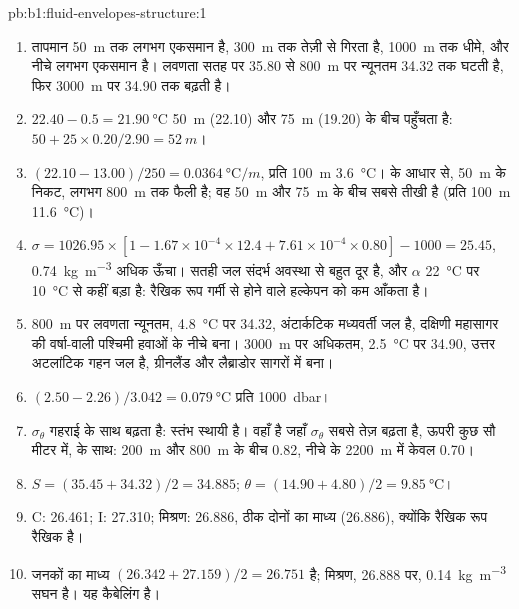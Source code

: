 \begin{solution}{pb:b1:fluid-envelopes-structure:1}
\begin{enumerate}
  \item तापमान \qty{50}{m} तक लगभग एकसमान है, \qty{300}{m} तक तेज़ी से गिरता है, \qty{1000}{m} तक धीमे, और नीचे लगभग एकसमान है। लवणता सतह पर 35.80 से \qty{800}{m} पर न्यूनतम 34.32 तक घटती है, फिर \qty{3000}{m} पर 34.90 तक बढ़ती है।
  \item $22.40 - 0.5 = \qty{21.90}{\celsius}$ \qty{50}{m} (22.10) और \qty{75}{m} (19.20) के बीच पहुँचता है: $50 + 25 \times 0.20/2.90 = \qty{52}{m}$।
  \item $(22.10 - 13.00)/250 = \qty{0.0364}{\celsius/m}$, प्रति \qty{100}{m} \qty{3.6}{\celsius}।   के आधार से, \qty{50}{m} के निकट, लगभग \qty{800}{m} तक फैली है; वह \qty{50}{m} और \qty{75}{m} के बीच सबसे तीखी है (प्रति \qty{100}{m} \qty{11.6}{\celsius})।
  \item $\sigma = 1026.95 \times [1 - 1.67\times10^{-4} \times 12.4 +
        7.61\times10^{-4} \times 0.80] - 1000 = 25.45$, \qty{0.74}{kg.m^{-3}} अधिक ऊँचा। सतही जल संदर्भ अवस्था से बहुत दूर है, और $\alpha$ \qty{22}{\celsius} पर \qty{10}{\celsius} से कहीं बड़ा है: रैखिक रूप गर्मी से होने वाले हल्केपन को कम आँकता है।
  \item \qty{800}{m} पर लवणता न्यूनतम, \qty{4.8}{\celsius} पर 34.32, अंटार्कटिक मध्यवर्ती जल है, दक्षिणी महासागर की वर्षा-वाली पश्चिमी हवाओं के नीचे बना। \qty{3000}{m} पर अधिकतम, \qty{2.5}{\celsius} पर 34.90, उत्तर अटलांटिक गहन जल है, ग्रीनलैंड और लैब्राडोर सागरों में बना।
  \item $(2.50 - 2.26)/3.042 = \qty{0.079}{\celsius}$ प्रति \qty{1000}{dbar}।
  \item $\sigma_\theta$ गहराई के साथ बढ़ता है: स्तंभ स्थायी है।  वहाँ है जहाँ $\sigma_\theta$ सबसे तेज़ बढ़ता है, ऊपरी कुछ सौ मीटर में,  के साथ: \qty{200}{m} और \qty{800}{m} के बीच \num{0.82}, नीचे के \qty{2200}{m} में केवल \num{0.70}।
  \item $S = (35.45 + 34.32)/2 = 34.885$; $\theta = (14.90 + 4.80)/2 =
        \qty{9.85}{\celsius}$।
  \item C: 26.461; I: 27.310; मिश्रण: 26.886, ठीक दोनों का माध्य (26.886), क्योंकि रैखिक रूप रैखिक है।
  \item जनकों का माध्य $(26.342 + 27.159)/2 = 26.751$ है; मिश्रण, 26.888 पर, \qty{0.14}{kg.m^{-3}} सघन है। यह कैबेलिंग है।

\end{enumerate}
\end{solution}

